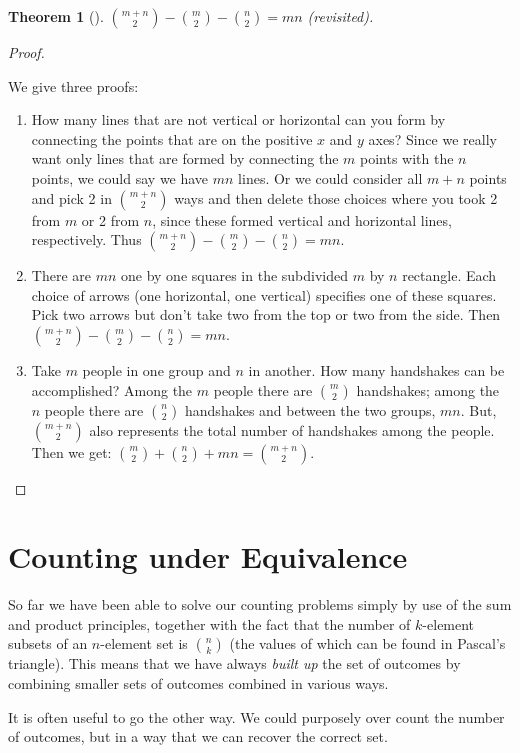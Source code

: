\documentclass[10pt,]{book}
\theoremstyle{plain}
\newtheorem{theorem}{Theorem}[section]
\theoremstyle{definition}
\theoremstyle{definition}
\theoremstyle{definition}
\theoremstyle{definition}
\numberwithin{equation}{chapter}
\begin{document}
\begin{theorem}[{}]\label{theorem-12}
\hypertarget{p-641}{}%
\(\binom{m + n}{2} - \binom{m}{2} - \binom{n}{2} = mn\) (revisited).%
\end{theorem}
\begin{proof}\hypertarget{proof-10}{}
\hypertarget{p-642}{}%
We give three proofs: \leavevmode%
\begin{enumerate}
\item\hypertarget{li-111}{}\hypertarget{p-643}{}%
How many lines that are not vertical or horizontal can you form by connecting the points that are on the positive \(x\) and \(y\) axes? Since we really want only lines that are formed by connecting the \(m\) points with the \(n\) points, we could say we have \(mn\) lines. Or we could consider all \(m + n\) points and pick 2 in \(\binom{m+n}{2}\) ways and then delete those choices where you took 2 from \(m\) or 2 from \(n\), since these formed vertical and horizontal lines, respectively.  Thus \(\binom{m + n}{2} - \binom{m}{2} - \binom{n}{2} = mn\).%
\item\hypertarget{li-112}{}\hypertarget{p-644}{}%
There are \(mn\) one by one squares in the subdivided \(m\) by \(n\) rectangle.  Each choice of arrows (one horizontal, one vertical) specifies one of these squares.  Pick two arrows but don't take two from the top or two from the side.  Then \(\binom{m + n}{2} - \binom{m}{2} - \binom{n}{2} = mn\).%
\item\hypertarget{li-113}{}\hypertarget{p-645}{}%
Take \(m\) people in one group and \(n\) in another. How many handshakes can be accomplished? Among the \(m\) people there are \(\binom{m}{2}\) handshakes; among the \(n\) people there are \(\binom{n}{2}\) handshakes and between the two groups, \(mn\). But, \(\binom{m + n}{2}\) also represents the total number of handshakes among the people. Then we get: \(\binom{m}{2} + \binom{n}{2} + mn = \binom{m + n}{2}\).%
\end{enumerate}
%
\end{proof}
\typeout{************************************************}
\typeout{************************************************}
\section[{Counting under Equivalence}]{Counting under Equivalence}\label{sec_basic-quotient}
\hypertarget{p-646}{}%
So far we have been able to solve our counting problems simply by use of the sum and product principles, together with the fact that the number of \(k\)-element subsets of an \(n\)-element set is \(\binom{n}{k}\) (the values of which can be found in Pascal's triangle). This means that we have always \emph{built up} the set of outcomes by combining smaller sets of outcomes combined in various ways.%
\par
\hypertarget{p-647}{}%
It is often useful to go the other way.  We could purposely over count the number of outcomes, but in a way that we can recover the correct set.%
\typeout{************************************************}
\typeout{************************************************}
\end{document}
